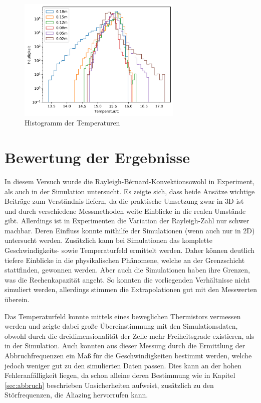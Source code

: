 \documentclass[12pt,a4paper,titlepage,headinclude]{scrartcl}
\numberwithin{equation}{subsection}
\begin{document}
\begin{figure}[!ht]
\centering
\includegraphics[width=0.7\textwidth]{hist}
\caption{Histogramm der Temperaturen}
\label{fig:hist}
\end{figure}


\newpage

\newpage
\section{Bewertung der Ergebnisse}
\label{sec:diskussion}
In diesem Versuch wurde die Rayleigh-Bérnard-Konvektionsowohl in Experiment, als auch in der Simulation untersucht.
Es zeigte sich, dass beide Ansätze wichtige Beiträge zum Verständnis liefern, da die praktische Umsetzung zwar in 3D ist und durch verschiedene Messmethoden weite Einblicke in die realen Umstände gibt.
Allerdings ist in Experimenten die Variation der Rayleigh-Zahl nur schwer machbar.
Deren Einfluss konnte mithilfe der Simulationen (wenn auch nur in 2D) untersucht werden.
Zusätzlich kann bei Simulationen das komplette Geschwindigkeits- sowie Temperaturfeld ermittelt werden.
Daher können deutlich tiefere Einblicke in die physikalischen Phänomene, welche an der Grenzschicht stattfinden, gewonnen werden.
Aber auch die Simulationen haben ihre Grenzen, was die Rechenkapazität angeht.
So konnten die vorliegenden Verhältnisse nicht simuliert werden, allerdings stimmen die Extrapolationen gut mit den Messwerten überein.


Das Temperaturfeld konnte mittels eines beweglichen Thermistors vermessen werden und zeigte dabei große Übereinstimmung mit den Simulationsdaten, obwohl durch die dreidimensionalität der Zelle mehr Freiheitsgrade existieren, als in der Simulation.
Auch konnten aus dieser Messung durch die Ermittlung der Abbruchfrequenzen ein Maß für die Geschwindigkeiten bestimmt werden, welche jedoch weniger gut zu den simulierten Daten passen.
Dies kann an der hohen Fehleranfälligkeit liegen, da schon alleine deren Bestimmung wie in Kapitel \ref{sec:abbruch} beschrieben Unsicherheiten aufweist, zusätzlich zu den Störfrequenzen, die Aliazing hervorrufen kann.
\end{document}
